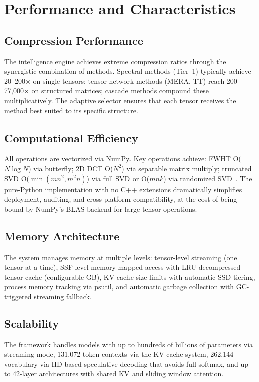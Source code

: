\documentclass[11pt,a4paper,twocolumn]{article}
\begin{document}
\section{Performance and Characteristics}
\label{sec:performance}

\subsection{Compression Performance}
The intelligence engine achieves extreme compression ratios through the synergistic combination of methods. Spectral methods (Tier~1) typically achieve 20--200$\times$ on single tensors; tensor network methods (MERA, TT) reach 200--77,000$\times$ on structured matrices; cascade methods compound these multiplicatively. The adaptive selector ensures that each tensor receives the method best suited to its specific structure.

\subsection{Computational Efficiency}
All operations are vectorized via NumPy. Key operations achieve: FWHT O($N \log N$) via butterfly; 2D DCT O($N^2$) via separable matrix multiply; truncated SVD O($\min(mn^2, m^2n)$) via full SVD or O($mnk$) via randomized SVD~\cite{halko2011randomized}. The pure-Python implementation with no C++ extensions dramatically simplifies deployment, auditing, and cross-platform compatibility, at the cost of being bound by NumPy's BLAS backend for large tensor operations.

\subsection{Memory Architecture}
The system manages memory at multiple levels: tensor-level streaming (one tensor at a time), SSF-level memory-mapped access with LRU decompressed tensor cache (configurable GB), KV cache size limits with automatic SSD tiering, process memory tracking via psutil, and automatic garbage collection with GC-triggered streaming fallback.

\subsection{Scalability}
The framework handles models with up to hundreds of billions of parameters via streaming mode, 131,072-token contexts via the KV cache system, 262,144 vocabulary via HD-based speculative decoding that avoids full softmax, and up to 42-layer architectures with shared KV and sliding window attention.
\end{document}
